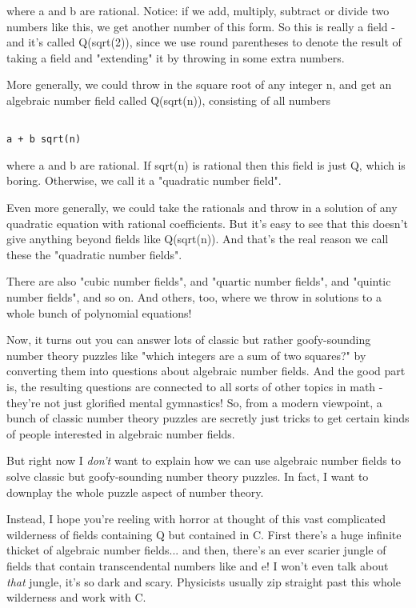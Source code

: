 where a and b are rational.  Notice: if we add, multiply, subtract or
divide two numbers like this, we get another number of this form.
So this is really a field - and it's called Q(sqrt(2)), since we use 
round parentheses to denote the result of taking a field and "extending" 
it by throwing in some extra numbers.

More generally, we could throw in the square root of any integer n, 
and get an algebraic number field called Q(sqrt(n)), consisting of all
numbers


\begin{verbatim}

a + b sqrt(n)
\end{verbatim}
    
where a and b are rational.  If sqrt(n) is rational then this field is
just Q, which is boring.  Otherwise, we call it a "quadratic number field".

Even more generally, we could take the rationals and throw in a
solution of any quadratic equation with rational coefficients.  But 
it's easy to see that this doesn't give anything beyond fields like
Q(sqrt(n)).  And that's the real reason we call these the "quadratic 
number fields".

There are also "cubic number fields", and "quartic number fields",
and "quintic number fields", and so on.  And others, too, where we
throw in solutions to a whole bunch of polynomial equations!

Now, it turns out you can answer lots of classic but rather goofy-sounding 
number theory puzzles like "which integers are a sum of two squares?" 
by converting them into questions about algebraic number fields.  
And the good part is, the resulting questions are connected to all sorts 
of other topics in math - they're not just glorified mental gymnastics!  
So, from a modern viewpoint, a bunch of classic number theory puzzles are 
secretly just tricks to get certain kinds of people interested in algebraic 
number fields.  

But right now I \emph{don't} want to explain how we can use algebraic number 
fields to solve classic but goofy-sounding number theory puzzles.
In fact, I want to downplay the whole puzzle aspect of number theory.

Instead, I hope you're reeling with horror at thought of this vast 
complicated wilderness of fields containing Q but contained in C.
First there's a huge infinite thicket of algebraic number fields...
and then, there's an ever scarier jungle of fields that contain 
transcendental numbers like \pi  and e!  I won't even talk about \emph{that}
jungle, it's so dark and scary.  Physicists usually zip straight past 
this whole wilderness and work with C.  

